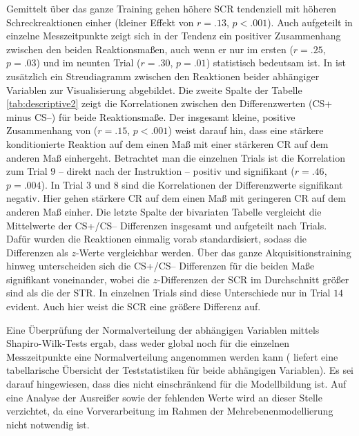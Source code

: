 	Gemittelt über das ganze Training gehen höhere SCR tendenziell mit höheren Schreckreaktionen einher (kleiner Effekt von $r=.13$, $p<.001$). Auch aufgeteilt in einzelne Messzeitpunkte zeigt sich in der Tendenz ein positiver Zusammenhang zwischen den beiden Reaktionsmaßen, auch wenn er nur im ersten ($r=.25$, $p=.03$) und im neunten Trial ($r=.30$, $p=.01$) statistisch bedeutsam ist. In  ist zusätzlich ein Streudiagramm zwischen den Reaktionen beider abhängiger Variablen zur Visualisierung abgebildet. 
	Die zweite Spalte der Tabelle \ref{tab:descriptive2} zeigt die Korrelationen zwischen den Differenzwerten (CS+ minus CS--) für beide Reaktionsmaße. Der insgesamt kleine, positive Zusammenhang von ($r=.15$, $p<.001$) weist darauf hin, dass eine stärkere konditionierte Reaktion auf dem einen Maß mit einer stärkeren CR auf dem anderen Maß einhergeht. Betrachtet man die einzelnen Trials ist die Korrelation zum Trial $9$ -- direkt nach der Instruktion -- positiv und signifikant ($r=.46$, $p=.004$). In Trial $3$ und $8$ sind die Korrelationen der Differenzwerte signifikant negativ. Hier gehen stärkere CR auf dem einen Maß mit geringeren  CR auf dem anderen Maß einher.
	Die letzte Spalte der bivariaten Tabelle vergleicht die Mittelwerte der CS+/CS-- Differenzen insgesamt und aufgeteilt nach Trials. Dafür wurden die Reaktionen einmalig vorab standardisiert, sodass die Differenzen als $z$-Werte vergleichbar werden. Über das ganze Akquisitionstraining hinweg unterscheiden sich die CS+/CS-- Differenzen für die beiden Maße signifikant voneinander, wobei die $z$-Differenzen der SCR im Durchschnitt größer sind als die der STR. In einzelnen Trials sind diese Unterschiede nur in Trial $14$ evident. Auch hier weist die SCR eine größere Differenz auf.
	
	Eine Überprüfung der Normalverteilung der abhängigen Variablen mittels Shapiro-Wilk-Tests \parencite{SHAPIRO1965} ergab, dass weder global noch für die einzelnen Messzeitpunkte eine Normalverteilung angenommen werden kann ( liefert eine tabellarische Übersicht der Teststatistiken für beide abhängigen Variablen). Es sei darauf hingewiesen, dass dies nicht einschränkend für die Modellbildung ist. Auf eine Analyse der Ausreißer sowie der fehlenden Werte wird an dieser Stelle verzichtet, da eine Vorverarbeitung im Rahmen der Mehrebenenmodellierung nicht notwendig ist. 

